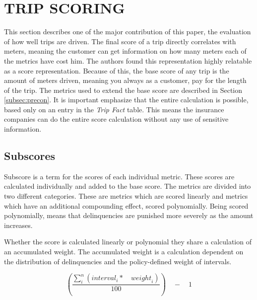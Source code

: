 \section{TRIP SCORING}\label{sec:trip}
This section describes one of the major contribution of this paper, the evaluation of how well trips are driven. The final score of a trip directly correlates with meters, meaning the customer can get information on how many meters each of the metrics have cost him. The authors found this representation highly relatable as a score representation.
Because of this, the base score of any trip is the amount of meters driven, meaning you always as a customer, pay for the length of the trip. The metrics used to extend the base score are described in Section \ref{subsec:precon}.
It is important emphasize that the entire calculation is possible, based only on an entry in the \textit{Trip Fact} table. This means the insurance companies can do the entire score calculation without any use of sensitive information.

\subsection{Subscores} 
Subscore is a term for the scores of each individual metric. These scores are calculated individually and added to the base score. The metrics are divided into two different categories. These are metrics which are scored linearly and metrics which have an additional compounding effect, scored polynomially. Being scored polynomially, means that delinquencies are punished more severely as the amount increases.

Whether the score is calculated linearly or polynomial they share a calculation of an accumulated weight. The accumulated weight is a calculation dependent on the distribution of delinquencies and the policy-defined weight of intervals.

$$
\left( \frac { \sum _{ i }^{ n }{ \left( { interval }_{ i }*\quad { weight }_{ i } \right)  }  }{ 100 }  \right) \quad -\quad 1
$$

